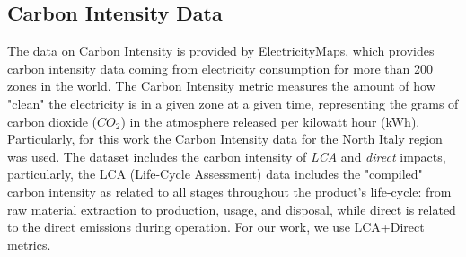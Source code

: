 \subsection{Carbon Intensity Data}
The data on Carbon Intensity is provided by ElectricityMaps, which provides carbon intensity data coming from electricity consumption for more than 200 zones in the world.
The Carbon Intensity metric measures the amount of how "clean" the electricity is in a given zone at a given time, representing the grams of carbon dioxide ($CO_2$) in the atmosphere released per kilowatt hour (kWh).
Particularly, for this work the Carbon Intensity data for the North Italy region was used.
The dataset includes the carbon intensity of \textit{LCA} and \textit{direct} \cite{CarbonIntensity} impacts, particularly, the LCA (Life-Cycle Assessment) data includes the "compiled" carbon intensity as related to all stages throughout the product’s life-cycle:
from raw material extraction to production, usage, and disposal, while direct is related to the direct emissions during operation. For our work, we use LCA+Direct metrics.
